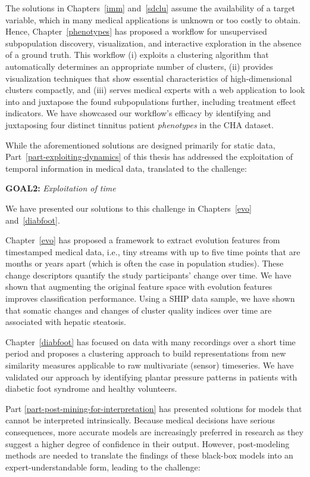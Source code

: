 \documentclass[
  oneside]{book}
\begin{document}
The solutions in Chapters~\ref{imm} and~\ref{sdclu} assume the availability of a target variable, which in many medical applications is unknown or too costly to obtain.
Hence, Chapter~\ref{phenotypes} has proposed a workflow for unsupervised subpopulation discovery, visualization, and interactive exploration in the absence of a ground truth.
This workflow (i) exploits a clustering algorithm that automatically determines an appropriate number of clusters, (ii) provides visualization techniques that show essential characteristics of high-dimensional clusters compactly, and (iii) serves medical experts with a web application to look into and juxtapose the found subpopulations further, including treatment effect indicators.
We have showcased our workflow's efficacy by identifying and juxtaposing four distinct tinnitus patient \emph{phenotypes} in the CHA dataset.

While the aforementioned solutions are designed primarily for static data, Part~\ref{part-exploiting-dynamics} of this thesis has addressed the exploitation of temporal information in medical data, translated to the challenge:

\textbf{GOAL2:} \emph{Exploitation of time}

We have presented our solutions to this challenge in Chapters~\ref{evo} and~\ref{diabfoot}.

Chapter~\ref{evo} has proposed a framework to extract evolution features from timestamped medical data, i.e., tiny streams with up to five time points that are months or years apart (which is often the case in population studies).
These change descriptors quantify the study participants' change over time.
We have shown that augmenting the original feature space with evolution features improves classification performance.
Using a SHIP data sample,
we have shown that somatic changes and changes of cluster quality indices over time are associated with hepatic steatosis.

Chapter~\ref{diabfoot} has focused on data with many recordings over a short time period and proposes a clustering approach to build representations from new similarity measures applicable to raw multivariate (sensor) timeseries.
We have validated our approach by identifying plantar pressure patterns in patients with diabetic foot syndrome and healthy volunteers.

Part \ref{part-post-mining-for-interpretation} has presented solutions for models that cannot be interpreted intrinsically.
Because medical decisions have serious consequences, more accurate models are increasingly preferred in research as they suggest a higher degree of confidence in their output.
However, post-modeling methods are needed to translate the findings of these black-box models into an expert-understandable form, leading to the challenge:
\end{document}
